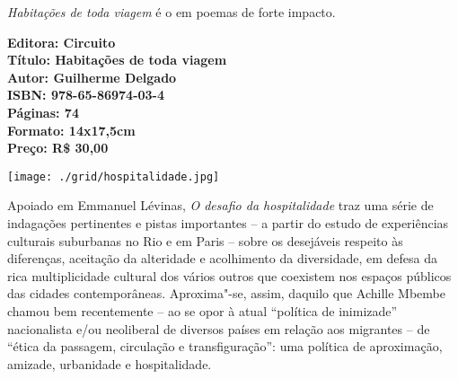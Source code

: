 \hspace*{-7cm}\hrulefill\hspace*{-7cm}

\medskip

\noindent{}\textit{Habitações de toda viagem} é o  em poemas de forte impacto.

%
%
%
%
%
% 


\vfill

\hspace*{-.4cm}\begin{minipage}[c]{1\linewidth}
\small\textbf{
\hspace*{-.1cm}Editora: Circuito\\
Título: Habitações de toda viagem\\
Autor: Guilherme Delgado\\ 
ISBN: 978-65-86974-03-4\\
Páginas: 74\\
Formato: 14x17,5cm\\
Preço: R\$ 30,00\\
}
\end{minipage}


\pagebreak %


\begin{center}
\hspace*{-3.6cm}
\hspace*{3.1cm}\texttt{[image: ./grid/hospitalidade.jpg]}
\end{center}

\hspace*{-7cm}\hrulefill\hspace*{-7cm}

\medskip

\noindent{}Apoiado em Emmanuel Lévinas, \textit{O desafio da hospitalidade} traz uma série de indagações pertinentes e pistas importantes – a partir do estudo de experiências culturais suburbanas no Rio e em Paris – sobre os desejáveis respeito às diferenças, aceitação da alteridade e acolhimento da diversidade, em defesa da rica multiplicidade cultural dos vários outros que coexistem nos espaços públicos das cidades contemporâneas. Aproxima"-se, assim, daquilo que Achille Mbembe chamou bem recentemente – ao se opor à atual “política de inimizade” nacionalista e/ou neoliberal de diversos países em relação aos migrantes – de “ética da passagem, circulação e transfiguração”: uma política de aproximação, amizade, urbanidade e hospitalidade. 

